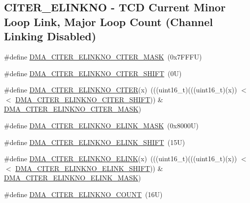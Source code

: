 \subsection*{C\+I\+T\+E\+R\+\_\+\+E\+L\+I\+N\+K\+NO -\/ T\+CD Current Minor Loop Link, Major Loop Count (Channel Linking Disabled)}
\begin{DoxyCompactItemize}
\item 
\#define \mbox{\hyperlink{group___d_m_a___register___masks_ga2e735a50b1a3e8dd35e863ccb9932dc2}{D\+M\+A\+\_\+\+C\+I\+T\+E\+R\+\_\+\+E\+L\+I\+N\+K\+N\+O\+\_\+\+C\+I\+T\+E\+R\+\_\+\+M\+A\+SK}}~(0x7\+F\+F\+F\+U)
\item 
\#define \mbox{\hyperlink{group___d_m_a___register___masks_ga8f8d80baa5e4e362665d8eb9781b09da}{D\+M\+A\+\_\+\+C\+I\+T\+E\+R\+\_\+\+E\+L\+I\+N\+K\+N\+O\+\_\+\+C\+I\+T\+E\+R\+\_\+\+S\+H\+I\+FT}}~(0\+U)
\item 
\#define \mbox{\hyperlink{group___d_m_a___register___masks_ga7f14dceacc2f8924097e69b1770cbff3}{D\+M\+A\+\_\+\+C\+I\+T\+E\+R\+\_\+\+E\+L\+I\+N\+K\+N\+O\+\_\+\+C\+I\+T\+ER}}(x)~(((uint16\+\_\+t)(((uint16\+\_\+t)(x)) $<$$<$ \mbox{\hyperlink{group___d_m_a___register___masks_ga8f8d80baa5e4e362665d8eb9781b09da}{D\+M\+A\+\_\+\+C\+I\+T\+E\+R\+\_\+\+E\+L\+I\+N\+K\+N\+O\+\_\+\+C\+I\+T\+E\+R\+\_\+\+S\+H\+I\+FT}})) \& \mbox{\hyperlink{group___d_m_a___register___masks_ga2e735a50b1a3e8dd35e863ccb9932dc2}{D\+M\+A\+\_\+\+C\+I\+T\+E\+R\+\_\+\+E\+L\+I\+N\+K\+N\+O\+\_\+\+C\+I\+T\+E\+R\+\_\+\+M\+A\+SK}})
\item 
\#define \mbox{\hyperlink{group___d_m_a___register___masks_ga97ca9c4d99839ee12bc10c712101038a}{D\+M\+A\+\_\+\+C\+I\+T\+E\+R\+\_\+\+E\+L\+I\+N\+K\+N\+O\+\_\+\+E\+L\+I\+N\+K\+\_\+\+M\+A\+SK}}~(0x8000\+U)
\item 
\#define \mbox{\hyperlink{group___d_m_a___register___masks_ga70c898d132a15d1d18b5a2d5863188a3}{D\+M\+A\+\_\+\+C\+I\+T\+E\+R\+\_\+\+E\+L\+I\+N\+K\+N\+O\+\_\+\+E\+L\+I\+N\+K\+\_\+\+S\+H\+I\+FT}}~(15\+U)
\item 
\#define \mbox{\hyperlink{group___d_m_a___register___masks_ga90da234a92b743da263644fec6fb9b22}{D\+M\+A\+\_\+\+C\+I\+T\+E\+R\+\_\+\+E\+L\+I\+N\+K\+N\+O\+\_\+\+E\+L\+I\+NK}}(x)~(((uint16\+\_\+t)(((uint16\+\_\+t)(x)) $<$$<$ \mbox{\hyperlink{group___d_m_a___register___masks_ga70c898d132a15d1d18b5a2d5863188a3}{D\+M\+A\+\_\+\+C\+I\+T\+E\+R\+\_\+\+E\+L\+I\+N\+K\+N\+O\+\_\+\+E\+L\+I\+N\+K\+\_\+\+S\+H\+I\+FT}})) \& \mbox{\hyperlink{group___d_m_a___register___masks_ga97ca9c4d99839ee12bc10c712101038a}{D\+M\+A\+\_\+\+C\+I\+T\+E\+R\+\_\+\+E\+L\+I\+N\+K\+N\+O\+\_\+\+E\+L\+I\+N\+K\+\_\+\+M\+A\+SK}})
\item 
\#define \mbox{\hyperlink{group___d_m_a___register___masks_ga352dd31d1393fbb464712b7a04da7fa0}{D\+M\+A\+\_\+\+C\+I\+T\+E\+R\+\_\+\+E\+L\+I\+N\+K\+N\+O\+\_\+\+C\+O\+U\+NT}}~(16\+U)
\end{DoxyCompactItemize}
